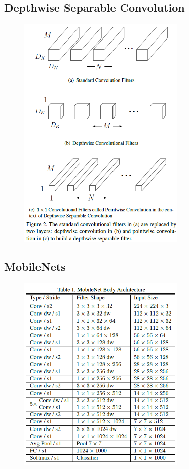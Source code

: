 \subsection{Depthwise Separable Convolution}
\begin{figure}[H]
    \centering
    \includegraphics[width=8cm]{images/models/depthwise_separable_conv.png}
    \label{fig:depthwise_separable_conv}
\end{figure}

\subsection{MobileNets}
\begin{figure}[H]
    \centering
    \includegraphics[width=8cm]{images/models/mobilenets.png}
    \label{fig:mobilenets}
\end{figure}

